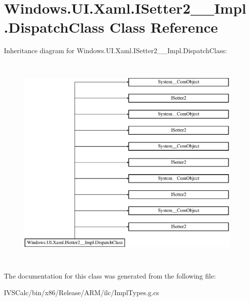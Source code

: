 \hypertarget{class_windows_1_1_u_i_1_1_xaml_1_1_i_setter2_____impl_1_1_dispatch_class}{}\section{Windows.\+U\+I.\+Xaml.\+I\+Setter2\+\_\+\+\_\+\+Impl.\+Dispatch\+Class Class Reference}
\label{class_windows_1_1_u_i_1_1_xaml_1_1_i_setter2_____impl_1_1_dispatch_class}
Inheritance diagram for Windows.\+U\+I.\+Xaml.\+I\+Setter2\+\_\+\+\_\+\+Impl.\+Dispatch\+Class\+:\begin{figure}[H]
\begin{center}
\leavevmode
\includegraphics[height=10.845070cm]{class_windows_1_1_u_i_1_1_xaml_1_1_i_setter2_____impl_1_1_dispatch_class}
\end{center}
\end{figure}


The documentation for this class was generated from the following file\+:\begin{DoxyCompactItemize}
\item 
I\+V\+S\+Calc/bin/x86/\+Release/\+A\+R\+M/ilc/Impl\+Types.\+g.\+cs\end{DoxyCompactItemize}
